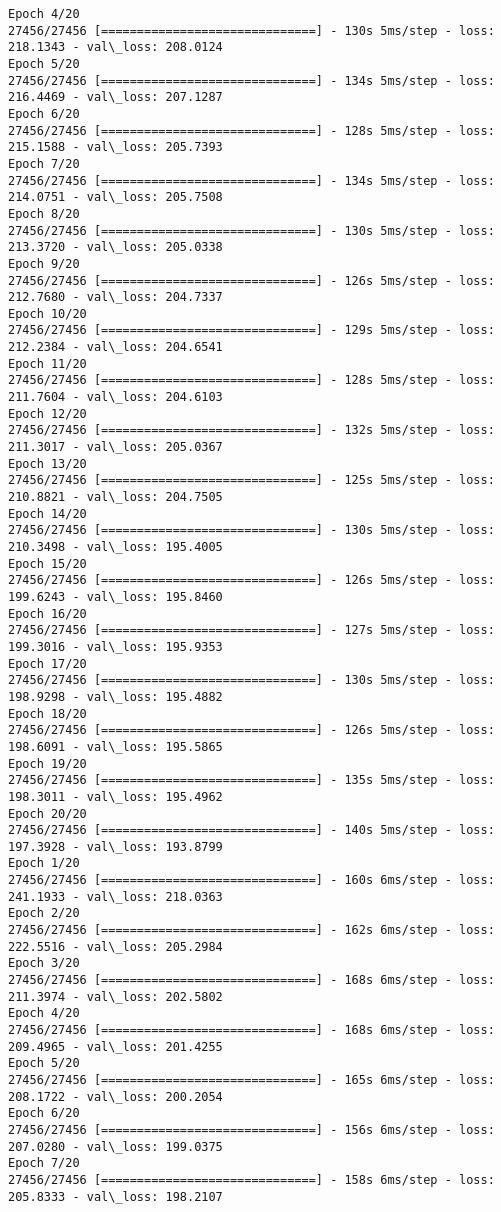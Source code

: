 \documentclass[11pt]{article}
\begin{document}
\begin{Verbatim}[commandchars=\\\{\}]
Epoch 4/20
27456/27456 [==============================] - 130s 5ms/step - loss: 218.1343 - val\_loss: 208.0124
Epoch 5/20
27456/27456 [==============================] - 134s 5ms/step - loss: 216.4469 - val\_loss: 207.1287
Epoch 6/20
27456/27456 [==============================] - 128s 5ms/step - loss: 215.1588 - val\_loss: 205.7393
Epoch 7/20
27456/27456 [==============================] - 134s 5ms/step - loss: 214.0751 - val\_loss: 205.7508
Epoch 8/20
27456/27456 [==============================] - 130s 5ms/step - loss: 213.3720 - val\_loss: 205.0338
Epoch 9/20
27456/27456 [==============================] - 126s 5ms/step - loss: 212.7680 - val\_loss: 204.7337
Epoch 10/20
27456/27456 [==============================] - 129s 5ms/step - loss: 212.2384 - val\_loss: 204.6541
Epoch 11/20
27456/27456 [==============================] - 128s 5ms/step - loss: 211.7604 - val\_loss: 204.6103
Epoch 12/20
27456/27456 [==============================] - 132s 5ms/step - loss: 211.3017 - val\_loss: 205.0367
Epoch 13/20
27456/27456 [==============================] - 125s 5ms/step - loss: 210.8821 - val\_loss: 204.7505
Epoch 14/20
27456/27456 [==============================] - 130s 5ms/step - loss: 210.3498 - val\_loss: 195.4005
Epoch 15/20
27456/27456 [==============================] - 126s 5ms/step - loss: 199.6243 - val\_loss: 195.8460
Epoch 16/20
27456/27456 [==============================] - 127s 5ms/step - loss: 199.3016 - val\_loss: 195.9353
Epoch 17/20
27456/27456 [==============================] - 130s 5ms/step - loss: 198.9298 - val\_loss: 195.4882
Epoch 18/20
27456/27456 [==============================] - 126s 5ms/step - loss: 198.6091 - val\_loss: 195.5865
Epoch 19/20
27456/27456 [==============================] - 135s 5ms/step - loss: 198.3011 - val\_loss: 195.4962
Epoch 20/20
27456/27456 [==============================] - 140s 5ms/step - loss: 197.3928 - val\_loss: 193.8799
Epoch 1/20
27456/27456 [==============================] - 160s 6ms/step - loss: 241.1933 - val\_loss: 218.0363
Epoch 2/20
27456/27456 [==============================] - 162s 6ms/step - loss: 222.5516 - val\_loss: 205.2984
Epoch 3/20
27456/27456 [==============================] - 168s 6ms/step - loss: 211.3974 - val\_loss: 202.5802
Epoch 4/20
27456/27456 [==============================] - 168s 6ms/step - loss: 209.4965 - val\_loss: 201.4255
Epoch 5/20
27456/27456 [==============================] - 165s 6ms/step - loss: 208.1722 - val\_loss: 200.2054
Epoch 6/20
27456/27456 [==============================] - 156s 6ms/step - loss: 207.0280 - val\_loss: 199.0375
Epoch 7/20
27456/27456 [==============================] - 158s 6ms/step - loss: 205.8333 - val\_loss: 198.2107

\end{Verbatim}
\end{document}
